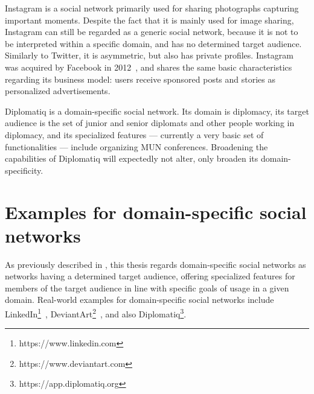 Instagram is a social network primarily used for sharing photographs capturing important moments. Despite the fact that it is mainly used for image sharing, Instagram can still be regarded as a generic social network, because it is not to be interpreted within a specific domain, and has no determined target audience. Similarly to Twitter, it is asymmetric, but also has private profiles. Instagram was acquired by Facebook in 2012~\cite{facebookacquiresinstagram}, and shares the same basic characteristics regarding its business model: users receive sponsored posts and stories as personalized advertisements.

Diplomatiq is a domain-specific social network. Its domain is diplomacy, its target audience is the set of junior and senior diplomats and other people working in diplomacy, and its specialized features — currently a very basic set of functionalities — include organizing MUN conferences. Broadening the capabilities of Diplomatiq will expectedly not alter, only broaden its domain-specificity.

\section{Examples for domain-specific social networks}

As previously described in , this thesis regards domain-specific social networks as networks having a determined target audience, offering specialized features for members of the target audience in line with specific goals of usage in a given domain. Real-world examples for domain-specific social networks include LinkedIn\footnote{https://www.linkedin.com}~\cite{about-linkedin}, DeviantArt\footnote{https://www.deviantart.com}~\cite{about-deviantart}, and also Diplomatiq\footnote{https://app.diplomatiq.org}.

